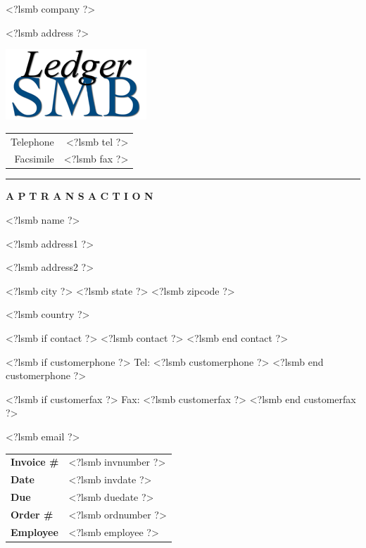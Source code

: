 \documentclass{scrartcl}
\begin{document}
\pagestyle{myheadings}
\thispagestyle{empty}

\fontsize{10pt}{12pt}\selectfont

\vspace*{-1.3cm}

\parbox{\textwidth}{%
  \parbox[b]{.42\textwidth}{%
    <?lsmb company ?>
   
    <?lsmb address ?>
  }
  \parbox[b]{.2\textwidth}{
    \includegraphics[scale=0.3]{ledger-smb}
  }\hfill
  \begin{tabular}[b]{rr@{}}
  Telephone & <?lsmb tel ?>\\
  Facsimile & <?lsmb fax ?>
  \end{tabular}

  \rule[1.5em]{\textwidth}{0.5pt}
}

\centerline{\textbf{A P} \hspace{0.3cm} \textbf{T R A N S A C T I O N}}

\vspace*{0.5cm}

\parbox[t]{.5\textwidth}{
<?lsmb name ?>

<?lsmb address1 ?>

<?lsmb address2 ?>

<?lsmb city ?> <?lsmb state ?> <?lsmb zipcode ?>

<?lsmb country ?>

\vspace{0.3cm}

<?lsmb if contact ?>
<?lsmb contact ?>
<?lsmb end contact ?>

\vspace{0.2cm}

<?lsmb if customerphone ?>
Tel: <?lsmb customerphone ?>
<?lsmb end customerphone ?>

<?lsmb if customerfax ?>
Fax: <?lsmb customerfax ?>
<?lsmb end customerfax ?>

<?lsmb email ?>
}
\hfill
\begin{tabular}[t]{ll}
  \textbf{Invoice \#} & <?lsmb invnumber ?> \\
  \textbf{Date} & <?lsmb invdate ?> \\
  \textbf{Due} & <?lsmb duedate ?> \\
  \textbf{Order \#} & <?lsmb ordnumber ?> \\
  \textbf{Employee} & <?lsmb employee ?> \\
\end{tabular}
\end{document}
